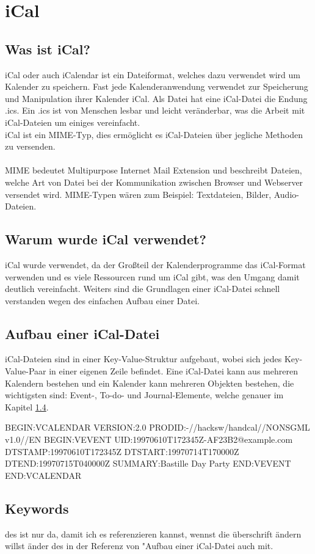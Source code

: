 \section{iCal}
\label{sec:iCal}
\subsection{Was ist iCal?}
\label{sec:wasIstiCal?}
iCal oder auch iCalendar ist ein Dateiformat, welches dazu verwendet wird um Kalender zu speichern. Fast jede Kalenderanwendung verwendet zur Speicherung und Manipulation ihrer Kalender iCal. Als Datei hat eine iCal-Datei die Endung .ics. Ein .ics ist von Menschen lesbar und leicht veränderbar, was die Arbeit mit iCal-Dateien um einiges vereinfacht. \\
iCal ist ein MIME-Typ, dies ermöglicht es iCal-Dateien über jegliche Methoden zu versenden.\\ \textcite{iCal-Basics} \\
MIME bedeutet Multipurpose Internet Mail Extension und beschreibt Dateien, welche Art von Datei bei der Kommunikation zwischen Browser und Webserver versendet wird. MIME-Typen wären zum Beispiel: Textdateien, Bilder, Audio-Dateien. \\ \textcite{MIME-Typ}


\subsection{Warum wurde iCal verwendet?}
\label{sec:warumWurdeiCalVerwendet?}
iCal wurde verwendet, da der Großteil der Kalenderprogramme das iCal-Format verwenden und es viele Ressourcen rund um iCal gibt, was den Umgang damit deutlich vereinfacht. Weiters sind die Grundlagen einer iCal-Datei schnell verstanden wegen des einfachen Aufbau einer Datei.

\subsection{Aufbau einer iCal-Datei}
\label{sec:aufbauEineriCalDatei}
iCal-Dateien sind in einer Key-Value-Struktur aufgebaut, wobei sich jedes Key-Value-Paar in einer eigenen Zeile befindet. Eine iCal-Datei kann aus mehreren Kalendern bestehen und ein Kalender kann mehreren Objekten bestehen, die wichtigsten sind: Event-, To-do- und Journal-Elemente, welche genauer im Kapitel \ref{sec:keywords}.

 BEGIN:VCALENDAR
 VERSION:2.0
 PRODID:-//hacksw/handcal//NONSGML v1.0//EN
 BEGIN:VEVENT
 UID:19970610T172345Z-AF23B2@example.com
 DTSTAMP:19970610T172345Z
 DTSTART:19970714T170000Z
 DTEND:19970715T040000Z
 SUMMARY:Bastille Day Party
 END:VEVENT
 END:VCALENDAR

\subsection{Keywords}
\label{sec:keywords}
des ist nur da, damit ich es referenzieren kannst, wennst die überschrift ändern willst änder des in der Referenz von "Aufbau einer iCal-Datei auch mit.